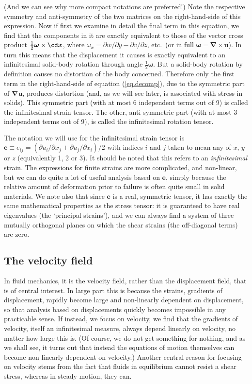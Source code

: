 \documentclass[a4paper,11pt]		{report}
\begin{document}
(And we can see why more compact notations are preferred!) Note the
respective symmetry and anti-symmetry of the two matrices on the
right-hand-side of this expression. Now if first we examine in detail
the final term in this equation, we find that the components in it are
exactly equivalent to those of the vector cross product
$\frac{1}{2}\bm{\omega}\times\cd \bm{x}$, where $\omega_{x}=\partial
w/\partial y - \partial v/\partial z$, etc.\ (or in full
$\bm{\omega}=\bm{\nabla}\times\bm{u}$). In turn this means that the
displacement it causes is exactly equivalent to an infinitesimal
solid-body rotation through angle $\frac{1}{2}\bm{\omega}$. But a
solid-body rotation by definition causes no distortion of the body
concerned. Therefore only the first term in the right-hand-side of
equation (\ref{eq.decomp}), due to the symmetric part of $\bm{\nabla
u}$, produces distortion (and, as we will see later, is associated
with stress in solids). This symmetric part (with at most 6
independent terms out of 9) is called the infinitesimal strain
tensor. The other, anti-symmetric part (with at most 3 independent
terms out of 9), is called the infinitesimal rotation tensor.

The notation we will use for the infinitesimal strain tensor is
$\bm{e}\equiv e_{ij}=(\partial u_i/\partial x_j + \partial
u_j/\partial x_i)/2$ with indices $i$ and $j$ taken to mean any of
$x$, $y$ or $z$ (equivalently 1, 2 or 3). It should be noted that this
refers to an \emph{infinitesimal} strain. The expressions for finite
strains are more complicated, and non-linear, but we can do quite a
lot of useful analysis based on $\bm{e}$, simply because the relative
amount of deformation prior to failure is often quite small in solid
materials. We note also that since $\bm{e}$ is a real, symmetric
tensor, it has exactly the same mathematical properties as the stress
tensor: it is guaranteed to have real eigenvalues (the `principal
strains'), and we can always find a system of three mutually
orthogonal planes on which the shear strains (the off-diagonal terms)
are zero.

\subsection{The velocity field}

In fluid mechanics, it is the velocity field, rather than the
displacement field, that is of central interest. In large part this is
because the strains, \ie gradients of displacement, rapidly become
large and non-linearly dependent on displacement, so that analysis
based on displacements quickly becomes impossible in any practicable
sense. If instead, we focus on velocity, we find that the gradients of
velocity, itself an infinitesimal measure, always depend linearly on
velocity, no matter how large this is.  (Of course, we do not get
something for nothing, and as we shall see, it turns out that instead
the equations of motion themselves can become non-linearly dependent
on velocity.) Another central reason for focusing on velocity stems
from the fact that fluids in equilibrium cannot resist a shear stress,
whereas in steady motion, they can.
\end{document}
